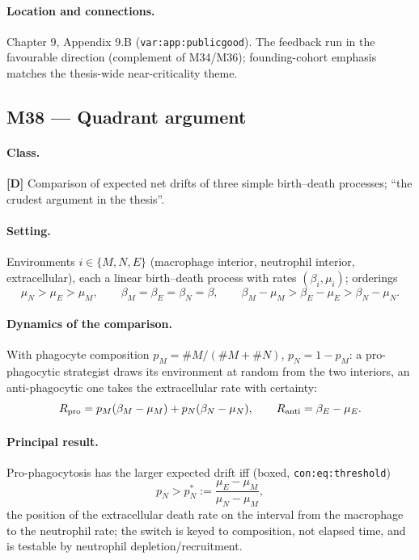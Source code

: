 \documentclass[11pt,a4paper]{article}
\begin{document}
\paragraph{Location and connections.} Chapter 9, Appendix 9.B
(\texttt{var:app:publicgood}). The feedback run in the favourable
direction (complement of M34/M36); founding-cohort emphasis matches the
thesis-wide near-criticality theme.

\subsection{M38 --- Quadrant argument \quad [D: comparison]}

\paragraph{Class.} \textbf{[D]} Comparison of expected net drifts of three
simple birth--death processes; ``the crudest argument in the thesis''.

\paragraph{Setting.} Environments $i\in\{M,N,E\}$ (macrophage interior,
neutrophil interior, extracellular), each a linear birth--death process
with rates $(\beta_i,\mu_i)$; orderings
\[
\mu_N>\mu_E>\mu_M,\qquad \beta_M=\beta_E=\beta_N=\beta,\qquad
\beta_M-\mu_M>\beta_E-\mu_E>\beta_N-\mu_N .
\]

\paragraph{Dynamics of the comparison.} With phagocyte composition
$p_M=\#M/(\#M+\#N)$, $p_N=1-p_M$: a pro-phagocytic strategist draws its
environment at random from the two interiors, an anti-phagocytic one takes
the extracellular rate with certainty:
\[
R_{\rm pro}=p_M(\beta_M-\mu_M)+p_N(\beta_N-\mu_N),\qquad
R_{\rm anti}=\beta_E-\mu_E .
\]

\paragraph{Principal result.} Pro-phagocytosis has the larger expected
drift iff (boxed, \texttt{con:eq:threshold})
\[
p_N>p_N^*:=\frac{\mu_E-\mu_M}{\mu_N-\mu_M},
\]
the position of the extracellular death rate on the interval from the
macrophage to the neutrophil rate; the switch is keyed to composition, not
elapsed time, and is testable by neutrophil depletion/recruitment.
\end{document}
